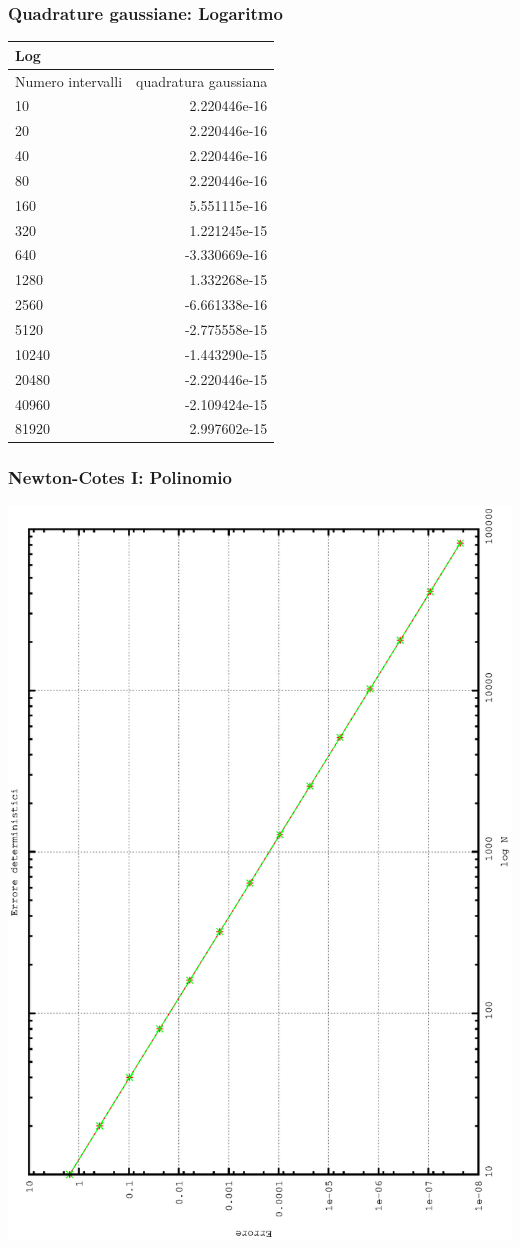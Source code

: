 \subsubsection*{Quadrature gaussiane: Logaritmo}
\begin{center}
\begin{longtable}[h]{lr}
\toprule
Log & \\
\midrule
Numero intervalli & quadratura gaussiana \\
10 &	2.220446e-16 \\
20 &	2.220446e-16 \\
40 &	2.220446e-16 \\ 
80 &	2.220446e-16 \\
160 &	5.551115e-16 \\ 
320 & 	1.221245e-15 \\
640 &	-3.330669e-16 \\ 
1280 &	1.332268e-15 \\
2560 &	 -6.661338e-16 \\
5120 &	 -2.775558e-15 \\ 
10240 &	-1.443290e-15 \\ 
20480 &	 -2.220446e-15 \\
40960 &	 -2.109424e-15 \\ 
81920 &	2.997602e-15 \\
\midrule

\bottomrule
\end{longtable}
\end{center}
\subsubsection*{Newton-Cotes I: Polinomio}
\begin{center}
\includegraphics[width=0.7\columnwidth,angle=-90]{plot_trap_poly.eps}
\end{center}

